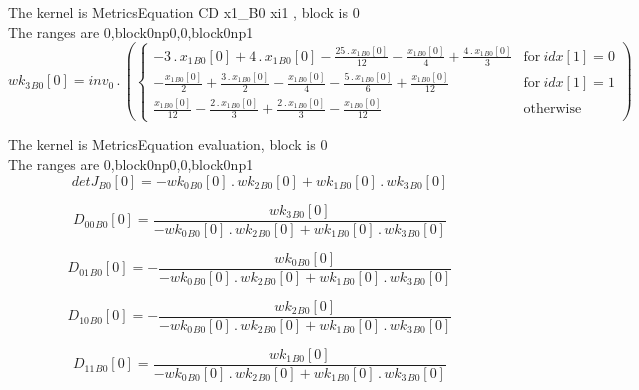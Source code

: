 \documentclass{article}
\begin{document}
\noindent The kernel is MetricsEquation CD x1_B0 xi1 , block is 0\\\noindent The ranges are 0,block0np0,0,block0np1\\\begin{dmath}{wk_{3}{_{B0}}}[{0}] = inv_0 \,.\, \left(\begin{cases} - 3 \,.\, {x_{1}{_{B0}}}[{0}] + 4 \,.\, {x_{1}{_{B0}}}[{0}] - \frac{25 \,.\, {x_{1}{_{B0}}}[{0}]}{12} - \frac{{x_{1}{_{B0}}}[{0}]}{4} + \frac{4 \,.\, {x_{1}{_{B0}}}[{0}]}{3} & 
\text{for}\: {idx}[{1}] = 0 \\- \frac{{x_{1}{_{B0}}}[{0}]}{2} + \frac{3 \,.\, {x_{1}{_{B0}}}[{0}]}{2} - \frac{{x_{1}{_{B0}}}[{0}]}{4} - \frac{5 \,.\, {x_{1}{_{B0}}}[{0}]}{6} + \frac{{x_{1}{_{B0}}}[{0}]}{12} & \text{for}\: {idx}[{1}] = 1 
\\\frac{{x_{1}{_{B0}}}[{0}]}{12} - \frac{2 \,.\, {x_{1}{_{B0}}}[{0}]}{3} + \frac{2 \,.\, {x_{1}{_{B0}}}[{0}]}{3} - \frac{{x_{1}{_{B0}}}[{0}]}{12} & \text{otherwise} \end{cases}\right)\end{dmath}

\noindent The kernel is MetricsEquation evaluation, block is 0\\\noindent The ranges are 0,block0np0,0,block0np1\\\begin{dmath}{detJ{_{B0}}}[{0}] = - {wk_{0}{_{B0}}}[{0}] \,.\, {wk_{2}{_{B0}}}[{0}] + {wk_{1}{_{B0}}}[{0}] \,.\, {wk_{3}{_{B0}}}[{0}]\end{dmath}

\begin{dmath}{D_{00}{_{B0}}}[{0}] = \frac{{wk_{3}{_{B0}}}[{0}]}{- {wk_{0}{_{B0}}}[{0}] \,.\, {wk_{2}{_{B0}}}[{0}] + {wk_{1}{_{B0}}}[{0}] \,.\, {wk_{3}{_{B0}}}[{0}]}\end{dmath}

\begin{dmath}{D_{01}{_{B0}}}[{0}] = - \frac{{wk_{0}{_{B0}}}[{0}]}{- {wk_{0}{_{B0}}}[{0}] \,.\, {wk_{2}{_{B0}}}[{0}] + {wk_{1}{_{B0}}}[{0}] \,.\, {wk_{3}{_{B0}}}[{0}]}\end{dmath}

\begin{dmath}{D_{10}{_{B0}}}[{0}] = - \frac{{wk_{2}{_{B0}}}[{0}]}{- {wk_{0}{_{B0}}}[{0}] \,.\, {wk_{2}{_{B0}}}[{0}] + {wk_{1}{_{B0}}}[{0}] \,.\, {wk_{3}{_{B0}}}[{0}]}\end{dmath}

\begin{dmath}{D_{11}{_{B0}}}[{0}] = \frac{{wk_{1}{_{B0}}}[{0}]}{- {wk_{0}{_{B0}}}[{0}] \,.\, {wk_{2}{_{B0}}}[{0}] + {wk_{1}{_{B0}}}[{0}] \,.\, {wk_{3}{_{B0}}}[{0}]}\end{dmath}
\end{document}
